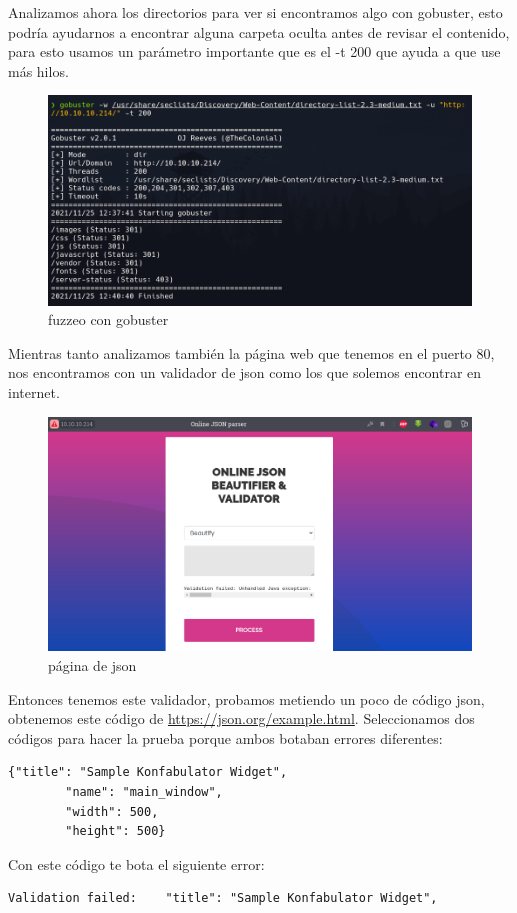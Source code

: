 \documentclass{article}
\begin{document}
\clearpage
Analizamos ahora los directorios para ver si encontramos algo con gobuster, esto podría ayudarnos a encontrar alguna carpeta oculta antes de revisar el contenido, para esto usamos un parámetro importante que es el -t 200 que ayuda a que use más hilos. 
\begin{figure}[H]
	\center
	\includegraphics[width=\textwidth]{images/time/gobuster.png}
	\caption{fuzzeo con gobuster}
\end{figure}
Mientras tanto analizamos también la página web que tenemos en el puerto 80, nos encontramos con un validador de json como los que solemos encontrar en internet.
\begin{figure}[H]
	\center
	\includegraphics[width=\textwidth]{images/time/index.png}
	\caption{página de json}
\end{figure}
\clearpage
Entonces tenemos este validador, probamos metiendo un poco de código json, obtenemos este código de \href{https://json.org/example.html}{https://json.org/example.html}.
Seleccionamos dos códigos para hacer la prueba porque ambos botaban errores diferentes:
\begin{lstlisting}[language={[ANSI]C}]  
	{"title": "Sample Konfabulator Widget",
    	"name": "main_window",
    	"width": 500,
    	"height": 500}
\end{lstlisting}
Con este código te bota el siguiente error:
\begin{lstlisting}[language={[ANSI]C}] 
	Validation failed:    "title": "Sample Konfabulator Widget",
\end{lstlisting}
\end{document}
